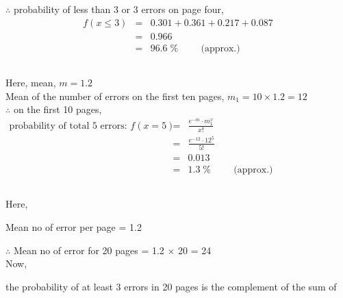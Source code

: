 \documentclass{article}
\begin{document}
{    \hspace{1.5em}$\therefore$ probability of less than 3 or 3 errors on page four,
    \begin{eqnarray*}
        f(x \leq 3) &=& 0.301 + 0.361 + 0.217 + 0.087\\
        &=& 0.966\\
        &=& 96.6\;\%\hspace{1cm}\text{(approx.)}
    \end{eqnarray*}

    \subsection{} Here, mean, $m = 1.2$\\

    \hspace{1.5em}Mean of the number of errors on the first ten pages, $m_1 = 10 \times 1.2 = 12$\\

    \hspace{1.5em}$\therefore$ on the first 10 pages,\\
    \begin{eqnarray*}
        \text{probability of total 5 errors: } f(x=5) &=& \frac{e^{-m}\cdot m_1^x}{x!}\\
        &=& \frac{e^{-12}\cdot 12^5}{5!}\\
        &=& 0.013\hspace{6cm}\\
        &=& 1.3\;\% \hspace{1cm}\text{(approx.)}
    \end{eqnarray*}

    \subsection{} Here,

    \hspace{1.5em} Mean no of error per page = 1.2

    \hspace{1.5em} $\therefore$ Mean no of error for 20 pages = 1.2 $\times$ 20 = 24
    \\

    \hspace{1.5em}Now,

    \hspace{1.5em}the probability of at least 3 errors in 20 pages is the complement of the sum of 

}
\end{document}

